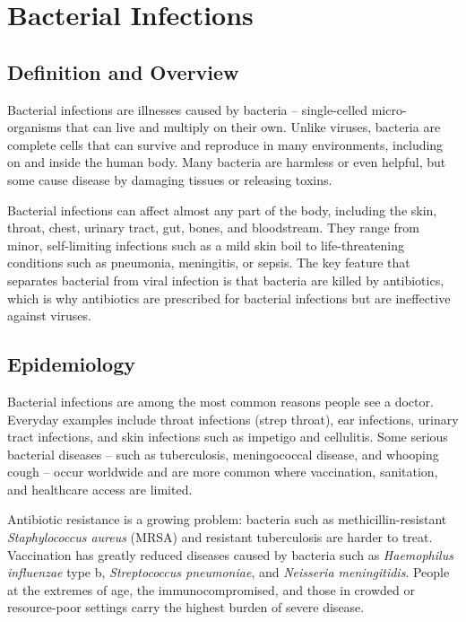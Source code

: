 \chapter{Bacterial Infections}

\section*{Definition and Overview}
Bacterial infections are illnesses caused by bacteria -- single-celled micro-organisms that can live and multiply on their own. Unlike viruses, bacteria are complete cells that can survive and reproduce in many environments, including on and inside the human body. Many bacteria are harmless or even helpful, but some cause disease by damaging tissues or releasing toxins.

Bacterial infections can affect almost any part of the body, including the skin, throat, chest, urinary tract, gut, bones, and bloodstream. They range from minor, self-limiting infections such as a mild skin boil to life-threatening conditions such as pneumonia, meningitis, or sepsis. The key feature that separates bacterial from viral infection is that bacteria are killed by antibiotics, which is why antibiotics are prescribed for bacterial infections but are ineffective against viruses.

\section*{Epidemiology}
Bacterial infections are among the most common reasons people see a doctor. Everyday examples include throat infections (strep throat), ear infections, urinary tract infections, and skin infections such as impetigo and cellulitis. Some serious bacterial diseases -- such as tuberculosis, meningococcal disease, and whooping cough -- occur worldwide and are more common where vaccination, sanitation, and healthcare access are limited.

Antibiotic resistance is a growing problem: bacteria such as methicillin-resistant \textit{Staphylococcus aureus} (MRSA) and resistant tuberculosis are harder to treat. Vaccination has greatly reduced diseases caused by bacteria such as \textit{Haemophilus influenzae} type b, \textit{Streptococcus pneumoniae}, and \textit{Neisseria meningitidis}. People at the extremes of age, the immunocompromised, and those in crowded or resource-poor settings carry the highest burden of severe disease.

